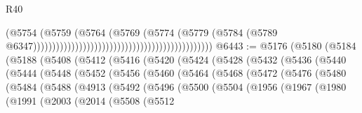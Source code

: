 \begin{lexlean}{R40}
\begin{coremodule}
                                                                                  (@5754
                                                                                    (@5759
                                                                                      (@5764
                                                                                        (@5769
                                                                                          (@5774
                                                                                            (@5779
                                                                                              (@5784
                                                                                                (@5789
                                                                                                  @6347)))))))))))))))))))))))))))))))))))))))))))))))
@6443 := @5176
    (@5180
      (@5184
        (@5188
          (@5408
            (@5412
              (@5416
                (@5420
                  (@5424
                    (@5428
                      (@5432
                        (@5436
                          (@5440
                            (@5444
                              (@5448
                                (@5452
                                  (@5456
                                    (@5460
                                      (@5464
                                        (@5468
                                          (@5472
                                            (@5476
                                              (@5480
                                                (@5484
                                                  (@5488
                                                    (@4913
                                                      (@5492
                                                        (@5496
                                                          (@5500
                                                            (@5504
                                                              (@1956
                                                                (@1967
                                                                  (@1980
                                                                    (@1991
                                                                      (@2003
                                                                        (@2014
                                                                          (@5508
                                                                            (@5512

\end{coremodule}
\end{lexlean}
